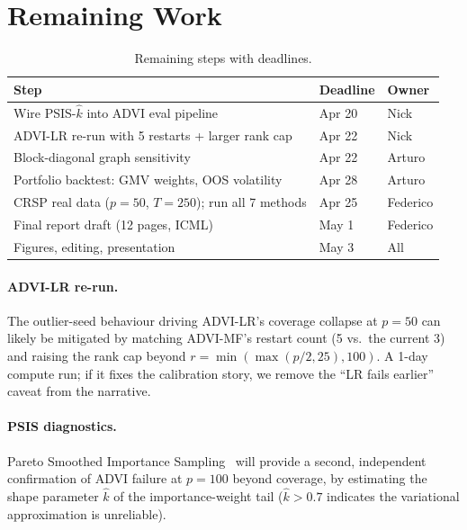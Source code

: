 \documentclass[10pt,conference,compsoc]{IEEEtran}
\begin{document}
\section{Remaining Work}

\begin{table}[ht]
\centering
\caption{Remaining steps with deadlines.}
\label{tab:remaining}
\small
\begin{tabular}{@{}p{5cm}ll@{}}
\toprule
\textbf{Step} & \textbf{Deadline} & \textbf{Owner} \\
\midrule
Wire PSIS-$\hat{k}$ into ADVI eval pipeline & Apr 20 & Nick \\
ADVI-LR re-run with 5 restarts + larger rank cap & Apr 22 & Nick \\
\midrule
Block-diagonal graph sensitivity & Apr 22 & Arturo \\
Portfolio backtest: GMV weights, OOS volatility & Apr 28 & Arturo \\
\midrule
CRSP real data ($p{=}50$, $T{=}250$); run all 7 methods & Apr 25 & Federico \\
Final report draft (12 pages, ICML) & May 1 & Federico \\
\midrule
Figures, editing, presentation & May 3 & All \\
\bottomrule
\end{tabular}
\end{table}

\paragraph{ADVI-LR re-run.} The outlier-seed behaviour driving ADVI-LR's coverage collapse at $p{=}50$ can likely be mitigated by matching ADVI-MF's restart count (5 vs.\ the current 3) and raising the rank cap beyond $r = \min(\max(p/2,25),100)$. A 1-day compute run; if it fixes the calibration story, we remove the ``LR fails earlier'' caveat from the narrative.

\paragraph{PSIS diagnostics.} Pareto Smoothed Importance Sampling~\cite{yao2018} will provide a second, independent confirmation of ADVI failure at $p{=}100$ beyond coverage, by estimating the shape parameter $\hat{k}$ of the importance-weight tail ($\hat{k} > 0.7$ indicates the variational approximation is unreliable).
\end{document}
